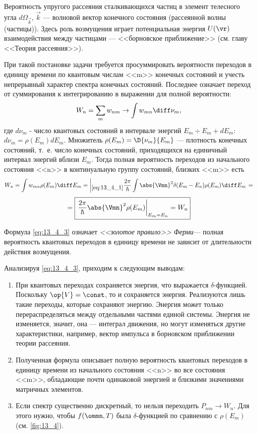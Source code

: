 \begin{exmpl}
Вероятность упругого рассеяния сталкивающихся частиц в элемент телесного угла $d\Omega_{\vec k}$, $\vec k$ --- волновой вектор конечного состояния (рассеянной волны (частицы)). Здесь роль возмущения играет потенциальная энергия $U(\vr)$ взаимодействия между частицами --- <<борновское приближение>> (см. главу  <<Теория рассеяния>>).
\end{exmpl}

При такой постановке задачи требуется просуммировать вероятности переходов в единицу времени по квантовым числам <<m>> конечных состояний и учесть непрерывный характер спектра конечных состояний. Последнее означает переход от суммирования к интегрированию в выражении для полной вероятности:
$$
W_n = \sum_m w_{nm} \to \int w_{mn} \diff\nu_m,
$$
где $d \nu_m$ - число квантовых состояний в интервале энергий $E_m \div E_m + dE_m$: \newline $\boxed{d \nu_m = \rho(E_m) dE_m}$. Множитель $\rho(E_m) = \D{\nu_m}{E_m}$ --- плотность конечных состояний, т.~е. число конечных состояний, приходящихся на единичный интервал энергий вблизи $E_m$. Тогда полная вероятность переходов из начального состояния <<n>> в континуальную группу состояний, близких <<m>> есть 
$$
W_n = \int w_{mn} \rho(E_m)\diff E_m = \left |_{\eqref{eq:13_4_1}} \dfrac{2\pi}{\hbar} \int \abs{\Vmn}^2 \delta(E_m - E_n) \rho(E_m)\diff E_m \right .=
$$
\begin{equation}
\label{eq:13_4_3}
= \boxed{ \left. \frac{2\pi}{\hbar} \abs{\Vmn}^2 \rho(E_m) \right|_{E_m = E_n} = W_n}
\end{equation}

Формула \eqref{eq:13_4_3} означает {\em <<золотое правило>> Ферми}\footnotemark --- полная вероятность квантовых переходов в единицу времени не зависит от длительности действия возмущения.

Анализируя \eqref{eq:13_4_3}, приходим к следующим выводам:
\begin{enumerate}
\item При квантовых переходах сохраняется энергия, что выражается $\delta$-функцией. Поскольку $\op{V} = \const$, то и сохраняется энергия. Реализуются лишь такие переходы, которые сохраняют энергию. Энергия может только перераспределяться между отдельными частями единой системы. Энергия не изменяется, значит, она --- интеграл движения, но могут изменяться другие характеристики, например, вектор импульса в борновском приближении теории рассеяния.

\item Полученная формула описывает полную вероятность квантовых переходов в единицу времени из начального состояния <<n>> во все состояния <<m>>, обладающие почти одинаковой энергией и близкими значениями матричных элементов. 

\item Если спектр существенно дискретный, то нельзя переходить ${P_{nm} \to W_n}$. Для этого нужно, чтобы $f(\ommn, T)$ была $\delta$-функцией по сравнению с $\rho(E_m)$ (см. \autoref{fig:13_4}). 
\end{enumerate}


